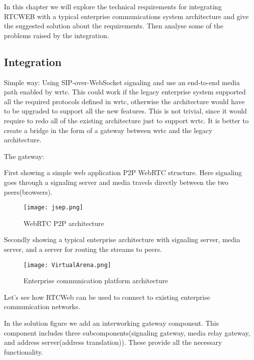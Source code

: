In this chapter we will explore the technical requirements for integrating RTCWEB with a typical enterprise communications system architecture and give the suggested solution about the requirements. Then analyse some of the problems raised by the integration.


\subsection{Integration}
Simple way:
Using SIP-over-WebSocket signaling and use an end-to-end media path enabled by \gls{wrtc}. This could work if the legacy enterprise system supported all the required protocols defined in \gls{wrtc}, otherwise the architecture would have to be upgraded to support all the new features. This is not trivial, since it would require to redo all of the existing architecture just to support \gls{wrtc}. It is better to create a bridge in the form of a gateway between \gls{wrtc} and the legacy architecture.

The gateway:

First showing a simple web application P2P WebRTC structure. Here signaling goes through a signaling server and media travels directly between the two peers(browsers).

\begin{figure}[here]
\centerline{\texttt{[image: jsep.png]}}
\caption{WebRTC P2P architecture}
\label{fig:jsep}
\end{figure}

Secondly showing a typical enterprise architecture with signaling server, media server, and a server for routing the streams to peers.

\begin{figure}[here]
\centerline{\texttt{[image: VirtualArena.png]}}
\caption{Enterprise communication platform architecture}
\label{fig:VirtualArenaArchitecture}
\end{figure}

Let's see how RTCWeb can be used to connect to existing enterprise communication networks.

In the solution figure we add an interworking gateway component. This component includes three subcomponents(signaling gateway, media relay gateway, and address server(address translation)). These provide all the necessary functionality.



